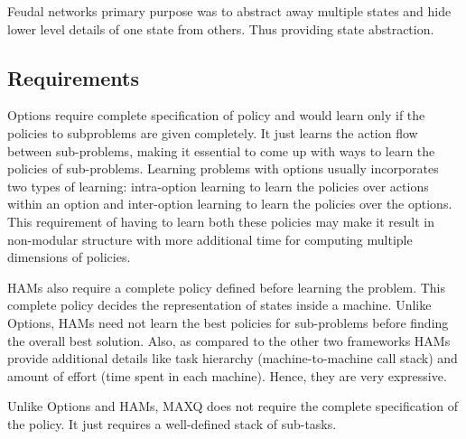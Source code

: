 Feudal networks primary purpose was to abstract away multiple states and hide lower level details of one state from others. Thus providing state abstraction.

\subsection{Requirements}

Options require complete specification of policy and would learn only if the policies to subproblems are given completely. It just learns the action flow between sub-problems, making it essential to come up with ways to learn the policies of sub-problems. Learning problems with options usually incorporates two types of learning: intra-option learning to learn the policies over actions within an option and inter-option learning to learn the policies over the options. This requirement of having to learn both these policies may make it result in non-modular structure with more additional time for computing multiple dimensions of policies.

HAMs also require a complete policy defined before learning the problem. This complete policy decides the representation of states inside a machine. Unlike Options, HAMs need not learn the best policies for sub-problems before finding the overall best solution. Also, as compared to the other two frameworks HAMs provide additional details like task hierarchy (machine-to-machine call stack) and amount of effort (time spent in each machine). Hence, they are very expressive.

Unlike Options and HAMs, MAXQ does not require the complete specification of the policy. It just requires a well-defined stack of sub-tasks.

